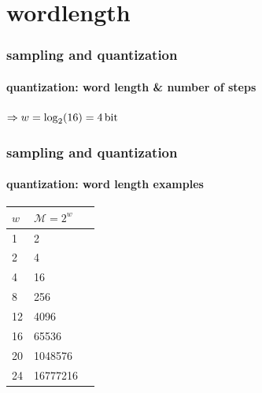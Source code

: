 \section[wordlength]{wordlength}
	\begin{frame}\frametitle{sampling and quantization}\framesubtitle{quantization: word length \& number of steps}
        \bigskip
        $\Rightarrow w = \log_2(16) = \unit[4]{bit}$
	\end{frame}
	
	\begin{frame}\frametitle{sampling and quantization}\framesubtitle{quantization: word length examples}
		\begin{table}
			\centering
			\begin{tabular}{llr}
			\hline
				$w$ & $\mathcal{M} = 2^w$ \\
			\hline
				1	&	2\\
				2	&	4\\
				4	&	16\\
				8	&	256\\
				12	&	4096\\
				16	&	65536\\
				20	&	1048576\\
				24	&	16777216\\
			\end{tabular}  
		\end{table}
	\end{frame}
	
